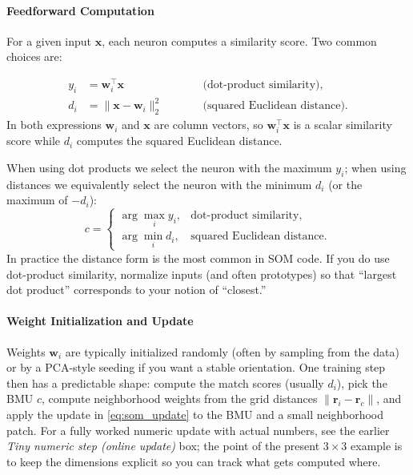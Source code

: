 \paragraph{Feedforward Computation}

For a given input \(\mathbf{x}\), each neuron computes a similarity score. Two common choices are:

\begin{equation}
    \begin{aligned}
        y_i &= \mathbf{w}_i^\top \mathbf{x} \qquad &&\text{(dot-product similarity)},\\
        d_i &= \|\mathbf{x} - \mathbf{w}_i\|_2^2 \qquad &&\text{(squared Euclidean distance)}.
    \end{aligned}
    \label{eq:som_similarity_measures}
\end{equation}
In both expressions \(\mathbf{w}_i\) and \(\mathbf{x}\) are column vectors, so \( \mathbf{w}_i^\top \mathbf{x}\) is a scalar similarity score while \(d_i\) computes the squared Euclidean distance.

When using dot products we select the neuron with the maximum \(y_i\); when using distances we equivalently select the neuron with the minimum \(d_i\) (or the maximum of \(-d_i\)):
\[
c =
\begin{cases}
\arg \max_i y_i, & \text{dot-product similarity},\\
\arg \min_i d_i, & \text{squared Euclidean distance}.
\end{cases}
\]
In practice the distance form is the most common in SOM code. If you do use dot-product similarity, normalize inputs (and often prototypes) so that ``largest dot product'' corresponds to your notion of ``closest.''

\paragraph{Weight Initialization and Update}

Weights \(\mathbf{w}_i\) are typically initialized randomly (often by sampling from the data) or by a PCA-style seeding if you want a stable orientation. One training step then has a predictable shape: compute the match scores (usually \(d_i\)), pick the BMU \(c\), compute neighborhood weights from the grid distances \(\|\mathbf{r}_i-\mathbf{r}_c\|\), and apply the update in \eqref{eq:som_update} to the BMU and a small neighborhood patch. For a fully worked numeric update with actual numbers, see the earlier \emph{Tiny numeric step (online update)} box; the point of the present \(3\times 3\) example is to keep the dimensions explicit so you can track what gets computed where.

